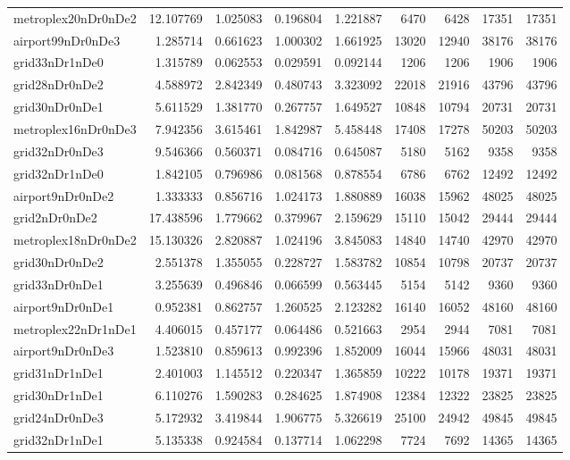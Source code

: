 \begin{longtable}{|l|r|r|r|r|r|r|r|r|}
metroplex20nDr0nDe2 & 12.107769 & 1.025083 & 0.196804 & 1.221887 & 6470 & 6428 & 17351 & 17351 \\
airport99nDr0nDe3 & 1.285714 & 0.661623 & 1.000302 & 1.661925 & 13020 & 12940 & 38176 & 38176 \\
grid33nDr1nDe0 & 1.315789 & 0.062553 & 0.029591 & 0.092144 & 1206 & 1206 & 1906 & 1906 \\
grid28nDr0nDe2 & 4.588972 & 2.842349 & 0.480743 & 3.323092 & 22018 & 21916 & 43796 & 43796 \\
grid30nDr0nDe1 & 5.611529 & 1.381770 & 0.267757 & 1.649527 & 10848 & 10794 & 20731 & 20731 \\
metroplex16nDr0nDe3 & 7.942356 & 3.615461 & 1.842987 & 5.458448 & 17408 & 17278 & 50203 & 50203 \\
grid32nDr0nDe3 & 9.546366 & 0.560371 & 0.084716 & 0.645087 & 5180 & 5162 & 9358 & 9358 \\
grid32nDr1nDe0 & 1.842105 & 0.796986 & 0.081568 & 0.878554 & 6786 & 6762 & 12492 & 12492 \\
airport9nDr0nDe2 & 1.333333 & 0.856716 & 1.024173 & 1.880889 & 16038 & 15962 & 48025 & 48025 \\
grid2nDr0nDe2 & 17.438596 & 1.779662 & 0.379967 & 2.159629 & 15110 & 15042 & 29444 & 29444 \\
metroplex18nDr0nDe2 & 15.130326 & 2.820887 & 1.024196 & 3.845083 & 14840 & 14740 & 42970 & 42970 \\
grid30nDr0nDe2 & 2.551378 & 1.355055 & 0.228727 & 1.583782 & 10854 & 10798 & 20737 & 20737 \\
grid33nDr0nDe1 & 3.255639 & 0.496846 & 0.066599 & 0.563445 & 5154 & 5142 & 9360 & 9360 \\
airport9nDr0nDe1 & 0.952381 & 0.862757 & 1.260525 & 2.123282 & 16140 & 16052 & 48160 & 48160 \\
metroplex22nDr1nDe1 & 4.406015 & 0.457177 & 0.064486 & 0.521663 & 2954 & 2944 & 7081 & 7081 \\
airport9nDr0nDe3 & 1.523810 & 0.859613 & 0.992396 & 1.852009 & 16044 & 15966 & 48031 & 48031 \\
grid31nDr1nDe1 & 2.401003 & 1.145512 & 0.220347 & 1.365859 & 10222 & 10178 & 19371 & 19371 \\
grid30nDr1nDe1 & 6.110276 & 1.590283 & 0.284625 & 1.874908 & 12384 & 12322 & 23825 & 23825 \\
grid24nDr0nDe3 & 5.172932 & 3.419844 & 1.906775 & 5.326619 & 25100 & 24942 & 49845 & 49845 \\
grid32nDr1nDe1 & 5.135338 & 0.924584 & 0.137714 & 1.062298 & 7724 & 7692 & 14365 & 14365 \\

\end{longtable}
